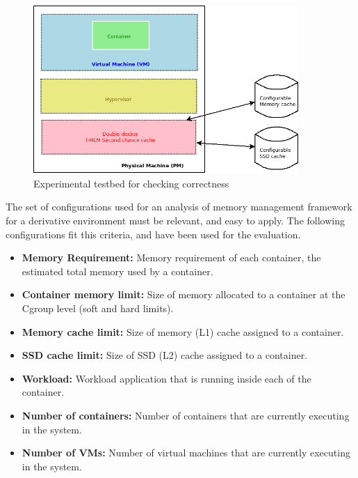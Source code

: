 	
	\begin{figure}
	  \centering
	  \includegraphics[width=0.9\textwidth]{images/correctness/exp_setup.png}
	  \caption{Experimental testbed for checking correctness}
	  \label{img:correctness_testbed}
	\end{figure}
	
	The set of configurations used for an analysis of memory management framework for a derivative environment 
	must be relevant, and easy to apply. The following configurations
fit this criteria, and have been used for the evaluation.

	  \begin{itemize}
	   \item \textbf{Memory Requirement:} Memory requirement of each container, the estimated total memory used by a container.
	   
	   \item \textbf{Container memory limit:} Size of memory allocated to a container at the Cgroup level (soft and hard limits). 
	   \item \textbf{Memory cache limit:} Size of memory (L1) cache assigned to a container. 
	   \item \textbf{SSD cache limit:} Size of SSD (L2) cache assigned to a container.
	   
	   \item \textbf{Workload:} Workload application that is running inside each of the container. 
	   \item \textbf{Number of containers:} Number of containers that are currently executing in the system.
	   \item \textbf{Number of VMs:} Number of virtual machines that are currently executing in the system.
	  \end{itemize}	  
	  
